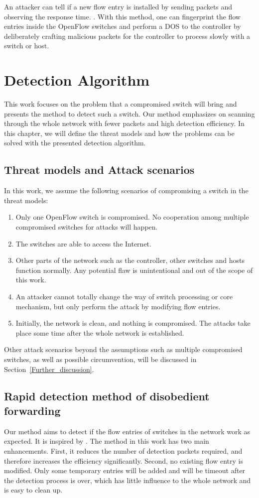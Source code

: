 \documentclass[conference]{IEEEtran}
\begin{document}
An attacker can tell if a new flow entry is installed by sending packets and observing the response time. \cite{BCKK15}. With this method, one can fingerprint the flow entries inside the OpenFlow switches and perform a DOS to the controller by deliberately crafting malicious packets for the controller to process slowly with a switch or host\cite{AAS14}.

\section{Detection Algorithm}
This work focuses on the problem that a compromised switch will bring and presents the method to detect such a switch. Our method emphasizes on scanning through the whole network with fewer packets and high detection efficiency. In this chapter, we will define the threat models and how the problems can be solved with the presented detection algorithm.

\subsection{Threat models and Attack scenarios}
In this work, we assume the following scenarios of compromising a switch in the threat models:
\begin{enumerate}
\item
Only one OpenFlow switch is compromised. No cooperation among multiple compromised switches for attacks will happen. 
\item
The switches are able to access the Internet. 
\item
Other parts of the network such as the controller, other switches and hosts function normally. Any potential flaw is unintentional and out of the scope of this work.
\item
An attacker cannot totally change the way of switch processing or core mechanism, but only perform the attack by modifying flow entries.
\item
Initially, the network is clean, and nothing is compromised. The attacks take place some time after the whole network is established.
\end{enumerate}

Other attack scenarios beyond the assumptions such as multiple compromised switches, as well as possible circumvention, will be discussed in Section~\ref{Further_discussion}.

\subsection{Rapid detection method of disobedient forwarding}
Our method aims to detect if the flow entries of switches in the network work as expected. It is inspired by \cite{CKGL15}. The method in this work has two main enhancements. First, it reduces the number of detection packets required, and therefore increases the efficiency significantly. Second, no existing flow entry is modified. Only some temporary entries will be added and will be timeout after the detection process is over, which has little influence to the whole network and is easy to clean up. 
\end{document}
